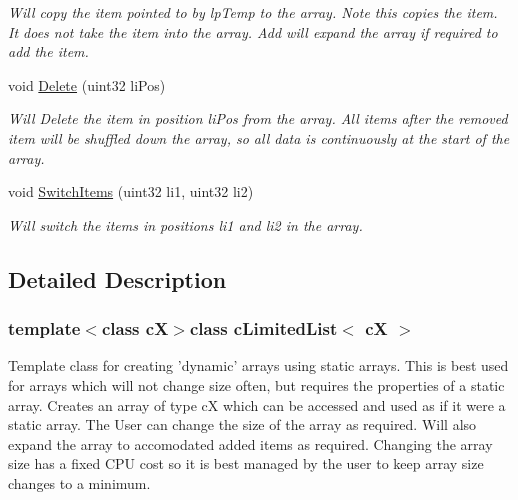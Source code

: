 \begin{DoxyCompactItemize}
\begin{DoxyCompactList}\small\item\em Will copy the item pointed to by lpTemp to the array. Note this copies the item. It does not take the item into the array. Add will expand the array if required to add the item. \end{DoxyCompactList}\item 
\hypertarget{classc_limited_list_a9393934e3eb488f3cb8887a9ead4b399}{
void \hyperlink{classc_limited_list_a9393934e3eb488f3cb8887a9ead4b399}{Delete} (uint32 liPos)}
\label{classc_limited_list_a9393934e3eb488f3cb8887a9ead4b399}

\begin{DoxyCompactList}\small\item\em Will Delete the item in position liPos from the array. All items after the removed item will be shuffled down the array, so all data is continuously at the start of the array. \end{DoxyCompactList}\item 
\hypertarget{classc_limited_list_a378286ba482d356510d9a7a7b00395d9}{
void \hyperlink{classc_limited_list_a378286ba482d356510d9a7a7b00395d9}{SwitchItems} (uint32 li1, uint32 li2)}
\label{classc_limited_list_a378286ba482d356510d9a7a7b00395d9}

\begin{DoxyCompactList}\small\item\em Will switch the items in positions li1 and li2 in the array. \end{DoxyCompactList}\end{DoxyCompactItemize}


\subsection{Detailed Description}
\subsubsection*{template$<$class cX$>$class cLimitedList$<$ cX $>$}

Template class for creating 'dynamic' arrays using static arrays. This is best used for arrays which will not change size often, but requires the properties of a static array. Creates an array of type cX which can be accessed and used as if it were a static array. The User can change the size of the array as required. Will also expand the array to accomodated added items as required. Changing the array size has a fixed CPU cost so it is best managed by the user to keep array size changes to a minimum. 

